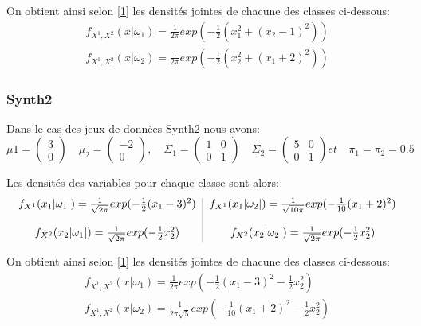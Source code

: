 \documentclass[10pt]{article}
\begin{document}
On obtient ainsi selon \eqref{1} les densités jointes de chacune des classes ci-dessous:
\begin{equation}
\begin{split}
		f_{X^{1}, X^{2}}(x|\omega_{1}) = \frac{1}{2\pi} exp(-\frac{1}{2}(x_{1}^2 + (x_{2}-1)^{2} ))  \\
f_{X^{1}, X^{2}}(x|\omega_{2}) = \frac{1}{2\pi} exp(-\frac{1}{2}(x_{2}^2 + (x_{1}+2)^{2} ))
\end{split}
\label{4}
\end{equation}


\subsubsection{Synth2}
Dans le cas des jeux de données Synth2 nous avons:
\[\mu{1}= \begin{pmatrix} 3 \\ 0 \end{pmatrix} \quad \mu_{2}= \begin{pmatrix} -2 \\ 0 \end{pmatrix}, \quad   \Sigma_{1} = \begin{pmatrix} 1 & 0 \\ 0 & 1	\end{pmatrix}  \quad  \Sigma_{2} = \begin{pmatrix} 5 & 0 \\ 0 & 1	\end{pmatrix}  et  \quad \pi_{1} = \pi_{2} = 0.5\]

Les densités des variables pour chaque classe sont alors:
\begin{equation}
\begin{tabular}{c | c}
$f_{X^{1}}(x_{1}|\omega_{1}|) = \frac{1}{\sqrt{2\pi}}exp(-\frac{1}{2} (x_{1} -3 )^{2})$ & 	$f_{X^{1}}(x_{1}|\omega_{2}|) = \frac{1}{\sqrt{10\pi}}exp(-\frac{1}{10} (x_{1}+2)^{2})$\\\\
$f_{X^{2}}(x_{2}|\omega_{1}|) = \frac{1}{\sqrt{2\pi}}exp(-\frac{1}{2} x_{2}^{2})$ & 	$f_{X^{2}}(x_{2}|\omega_{2}|) = \frac{1}{\sqrt{2\pi}}exp(-\frac{1}{2} x_{2}^{2})$\\
\end{tabular}
\label{5}
\end{equation}

On obtient ainsi selon \eqref{1} les densités jointes de chacune des classes ci-dessous:
\begin{equation}
\begin{split}
f_{X^{1}, X^{2}}(x|\omega_{1}) = \frac{1}{2\pi} exp(-\frac{1}{2}(x_{1}-3)^2 - \frac{1}{2}x_{2}^2       )  \\
f_{X^{1}, X^{2}}(x|\omega_{2}) = \frac{1}{2\pi\sqrt{5}} exp(-\frac{1}{10}(x_{1}+2)^{2}  - \frac{1}{2}x_{2}^{2})
\end{split}
\label{6}
\end{equation}
\end{document}
